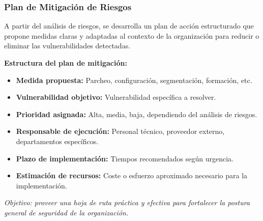 \documentclass[a4paper, 11pt]{article}
\begin{document}
\subsubsection{Plan de Mitigación de Riesgos}

A partir del análisis de riesgos, se desarrolla un plan de acción estructurado que propone medidas claras y adaptadas al contexto de la organización para reducir o eliminar las vulnerabilidades detectadas.

\textbf{Estructura del plan de mitigación:}
\begin{itemize}
\item \textbf{Medida propuesta:} Parcheo, configuración, segmentación, formación, etc.
\item \textbf{Vulnerabilidad objetivo:} Vulnerabilidad específica a resolver.
\item \textbf{Prioridad asignada:} Alta, media, baja, dependiendo del análisis de riesgos.
\item \textbf{Responsable de ejecución:} Personal técnico, proveedor externo, departamentos específicos.
\item \textbf{Plazo de implementación:} Tiempos recomendados según urgencia.
\item \textbf{Estimación de recursos:} Coste o esfuerzo aproximado necesario para la implementación.
\end{itemize}

\textit{Objetivo: proveer una hoja de ruta práctica y efectiva para fortalecer la postura general de seguridad de la organización.}

\vspace{0.5cm}






































\clearpage




\end{document}
